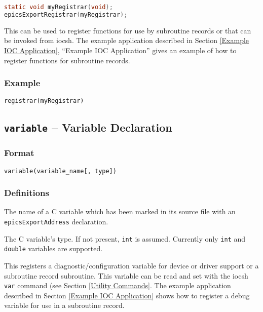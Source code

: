 \begin{lstlisting}[language=C]
static void myRegistrar(void);
epicsExportRegistrar(myRegistrar);
\end{lstlisting}

This can be used to register functions for use by subroutine records or that can be invoked from iocsh.
The example application described in Section \ref{Example IOC Application}, ``Example IOC Application'' gives an example of how to register functions for subroutine records.

\subsubsection{Example}

\begin{verbatim}
registrar(myRegistrar)
\end{verbatim}

\subsection{\texttt{variable} -- Variable Declaration}

\subsubsection{Format}

\begin{verbatim}
variable(variable_name[, type])
\end{verbatim}

\subsubsection{Definitions}

\begin{description}
\item [variable\_name] The name of a C variable which has been marked in its source file with an 
\verb|epicsExportAddress| declaration.

\item [type] The C variable's type.
If not present, \verb|int| is assumed.
Currently only \verb|int| and \verb|double| variables are supported.
\end{description}

This registers a diagnostic/configuration variable for device or driver support or a subroutine record subroutine.
This variable can be read and set with the iocsh \verb|var| command (see Section \ref{Utility Commands}.
The example application described in Section \ref{Example IOC Application} shows how to register a debug variable for use in a subroutine record.

